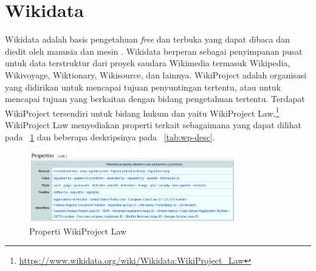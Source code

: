 \section{Wikidata}
\label{sec:wikidata}

Wikidata adalah basis pengetahuan \textit{free} dan terbuka yang dapat dibaca dan diedit oleh
manusia dan mesin \citep{wikidata}. Wikidata berperan sebagai penyimpanan pusat untuk data
terstruktur dari proyek saudara Wikimedia termasuk Wikipedia, Wikivoyage, Wiktionary, Wikisource,
dan lainnya. WikiProject adalah organisasi yang didirikan untuk mencapai tujuan penyuntingan
tertentu, atau untuk mencapai tujuan yang berkaitan dengan bidang pengetahuan tertentu. Terdapat
WikiProject tersendiri untuk bidang hukum dan \legal yaitu WikiProject
Law.\footnote{\url{https://www.wikidata.org/wiki/Wikidata:WikiProject_Law}} WikiProject Law
menyediakan properti terkait \legal sebagaimana yang dapat dilihat pada \pic~\ref{fig:wikiproject}
dan beberapa deskripsinya pada \tab~\ref{tab:wp-desc}.

\begin{figure}[H]
  \centering
  \includegraphics[width=0.8\textwidth]{pictures/wikiproject.png}
  \caption{Properti WikiProject Law}
  \label{fig:wikiproject}
\end{figure}

